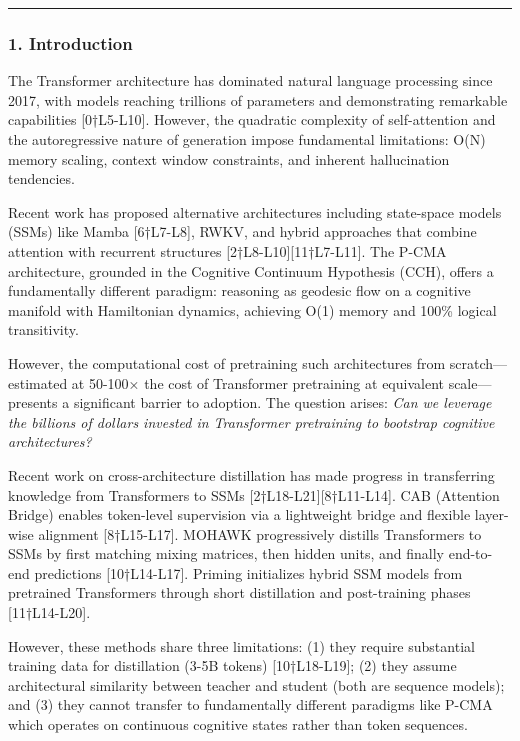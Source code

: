 \documentclass[
  11pt,
  a4paper,
]{article}
\begin{document}
\begin{center}\rule{0.5\linewidth}{0.5pt}\end{center}

\subsubsection{1. Introduction}\label{introduction-2}

The Transformer architecture has dominated natural language processing
since 2017, with models reaching trillions of parameters and
demonstrating remarkable capabilities {[}0†L5-L10{]}. However, the
quadratic complexity of self-attention and the autoregressive nature of
generation impose fundamental limitations: O(N) memory scaling, context
window constraints, and inherent hallucination tendencies.

Recent work has proposed alternative architectures including state-space
models (SSMs) like Mamba {[}6†L7-L8{]}, RWKV, and hybrid approaches that
combine attention with recurrent structures
{[}2†L8-L10{]}{[}11†L7-L11{]}. The P-CMA architecture, grounded in the
Cognitive Continuum Hypothesis (CCH), offers a fundamentally different
paradigm: reasoning as geodesic flow on a cognitive manifold with
Hamiltonian dynamics, achieving O(1) memory and 100\% logical
transitivity.

However, the computational cost of pretraining such architectures from
scratch---estimated at 50-100× the cost of Transformer pretraining at
equivalent scale---presents a significant barrier to adoption. The
question arises: \emph{Can we leverage the billions of dollars invested
in Transformer pretraining to bootstrap cognitive architectures?}

Recent work on cross-architecture distillation has made progress in
transferring knowledge from Transformers to SSMs
{[}2†L18-L21{]}{[}8†L11-L14{]}. CAB (Attention Bridge) enables
token-level supervision via a lightweight bridge and flexible layer-wise
alignment {[}8†L15-L17{]}. MOHAWK progressively distills Transformers to
SSMs by first matching mixing matrices, then hidden units, and finally
end-to-end predictions {[}10†L14-L17{]}. Priming initializes hybrid SSM
models from pretrained Transformers through short distillation and
post-training phases {[}11†L14-L20{]}.

However, these methods share three limitations: (1) they require
substantial training data for distillation (3-5B tokens)
{[}10†L18-L19{]}; (2) they assume architectural similarity between
teacher and student (both are sequence models); and (3) they cannot
transfer to fundamentally different paradigms like P-CMA which operates
on continuous cognitive states rather than token sequences.
\end{document}

